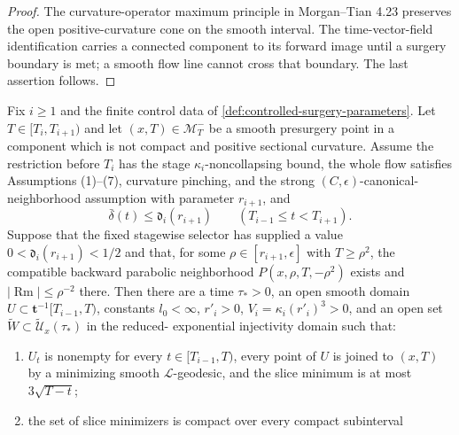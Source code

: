 \begin{proof}
The curvature-operator maximum principle in Morgan--Tian 4.23 preserves the
open positive-curvature cone on the smooth interval.  The time-vector-field
identification carries a connected component to its forward image until a
surgery boundary is met; a smooth flow line cannot cross that boundary.  The
last assertion follows.
\end{proof}

\begin{proposition}
\label{prop:stagewise-reduced-exponential-family}
\notready
Fix $i\ge1$ and the finite control data of
\ref{def:controlled-surgery-parameters}.  Let $T\in[T_i,T_{i+1})$ and let
$(x,T)\in\mathcal M_T^-$ be a smooth presurgery point in a component which is
not compact and positive sectional curvature.  Assume the restriction before
$T_i$ has the stage
$\kappa_i$-noncollapsing bound, the whole flow satisfies Assumptions (1)--(7),
curvature pinching, and the strong $(C,\epsilon)$-canonical-neighborhood
assumption with parameter $r_{i+1}$, and
\[
 \bar\delta(t)\le\mathfrak d_i(r_{i+1})
 \qquad(T_{i-1}\le t<T_{i+1}).
\]
Suppose that the fixed stagewise selector has supplied a value
$0<\mathfrak d_i(r_{i+1})<1/2$ and that, for some
$\rho\in[r_{i+1},\epsilon]$ with $T\ge\rho^2$, the compatible backward
parabolic neighborhood
$P(x,\rho,T,-\rho^2)$ exists and
$|\operatorname{Rm}|\le\rho^{-2}$ there.  Then there are a time
$\tau_*>0$, an open smooth domain $U\subset\mathbf t^{-1}[T_{i-1},T)$,
constants $l_0<\infty$, $r'_i>0$, $V_i=\kappa_i(r'_i)^3>0$, and an open set
$\widetilde W\subset\widetilde{\mathcal U}_x(\tau_*)$ in the reduced-
exponential injectivity domain such that:
\begin{enumerate}
\item $U_t$ is nonempty for every $t\in[T_{i-1},T)$, every point of $U$
      is joined to $(x,T)$ by a minimizing smooth $\mathcal L$-geodesic,
      and the slice minimum is at most $3\sqrt{T-t}$;
\item the set of slice minimizers is compact over every compact subinterval

\end{enumerate}
\end{proposition}
